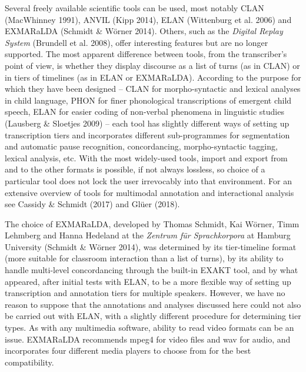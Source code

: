 \documentclass[11pt]{article}
\newenvironment{styleStandard}{\renewcommand\baselinestretch{1.25}\setlength\leftskip{0cm}\setlength\rightskip{0cm plus 1fil}\setlength\parindent{0cm}\setlength\parfillskip{0pt plus 1fil}\setlength\parskip{0in plus 1pt}\writerlistparindent\writerlistleftskip\leavevmode\normalfont\normalsize\writerlistlabel\ignorespaces}{\unskip\vspace{0.139in plus 0.0139in}\par}
\newcommand\writerlistleftskip{}
\newcommand\writerlistparindent{}
\newcommand\writerlistlabel{}
\begin{document}
\begin{styleStandard}
Several freely available scientific tools can be used, most notably CLAN (MacWhinney 1991), ANVIL (Kipp 2014), ELAN (Wittenburg et al. 2006) and EXMARaLDA (Schmidt \& Wörner 2014). Others, such as the\textit{ Digital Replay System }(Brundell et al. 2008), offer interesting features but are no longer supported. The most apparent difference between tools, from the transcriber’s point of view, is whether they display discourse as a list of turns (as in CLAN) or in tiers of timelines (as in ELAN or EXMARaLDA). According to the purpose for which they have been designed – CLAN for morpho-syntactic and lexical analyses in child language, PHON for finer phonological transcriptions of emergent child speech, ELAN for easier coding of non-verbal phenomena in linguistic studies (Lausberg \& Sloetjes 2009) – each tool has slightly different ways of setting up transcription tiers and incorporates different sub-programmes for segmentation and automatic pause recognition, concordancing, morpho-syntactic tagging, lexical analysis, etc. With the most widely-used tools, import and export from and to the other formats is possible, if not always lossless, so choice of a particular tool does not lock the user irrevocably into that environment. For an extensive overview of tools for multimodal annotation and interactional analysis see Cassidy \& Schmidt (2017) and Glüer (2018).
\end{styleStandard}

\begin{styleStandard}
The choice of EXMARaLDA, developed by Thomas Schmidt, Kai Wörner, Timm Lehmberg and Hanna Hedeland at the \textit{Zentrum für Sprachkorpora }at Hamburg University (Schmidt \& Wörner 2014), was determined by its tier-timeline format (more suitable for classroom interaction than a list of turns), by its ability to handle multi-level concordancing through the built-in EXAKT tool, and by what appeared, after initial tests with ELAN, to be a more flexible way of setting up transcription and annotation tiers for multiple speakers. However, we have no reason to suppose that the annotations and analyses discussed here could not also be carried out with ELAN, with a slightly different procedure for determining tier types. As with any multimedia software, ability to read video formats can be an issue. EXMARaLDA recommends mpeg4 for video files and wav for audio, and incorporates four different media players to choose from for the best compatibility.
\end{styleStandard}
\end{document}
